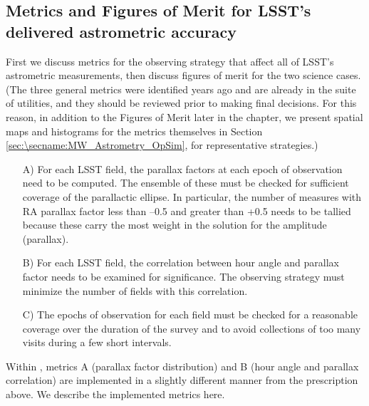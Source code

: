 


\subsection{Metrics and Figures of Merit for LSST's delivered astrometric accuracy}
\label{sec:\secname:MW_Astrometry_metrics}


First we discuss metrics for the observing strategy that affect all of
LSST's astrometric measurements, then discuss figures of merit for the
two science cases. (The three general metrics were identified years
ago and are already in the suite of \MAF utilities, and they should be
reviewed prior to making final decisions. For this reason, in addition
to the Figures of Merit later in the chapter, we present spatial maps
and histograms for the metrics themselves in Section
\ref{sec:\secname:MW_Astrometry_OpSim}, for representative \OpSim
strategies.)

\begin{itemize}
\item[A)] For each LSST field, the parallax factors at each epoch of
observation need to be computed.  The ensemble of these must be checked for
sufficient coverage of the parallactic ellipse.  In particular, the number of
measures with RA parallax factor less than --0.5 and greater than +0.5
needs to be tallied because these carry the most weight in the solution
for the amplitude (parallax).
\item[B)] For each LSST field,
the correlation between hour angle and parallax factor
needs to be examined for significance.  The observing strategy must minimize
the number of fields with this correlation.
\item[C)] The epochs of observation for each field must be checked for a
reasonable coverage over the duration of the survey and to avoid
collections of too many visits during a few short intervals.
\end{itemize}

Within \MAF, metrics A (parallax factor distribution) and B
  (hour angle and parallax correlation) are implemented in a slightly
  different manner from the prescription above. We describe the
  implemented metrics here.

